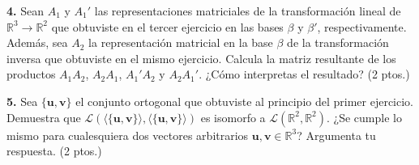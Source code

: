 \documentclass[a4paper]{article}
\begin{document}
\vspace{5mm}
\textbf{4.} Sean $A_1$ y $A_1'$ las representaciones matriciales de la transformación lineal de $\mathbb{R}^3\to\mathbb{R}^2$ que obtuviste en el tercer ejercicio en las bases $\beta$ y $\beta'$, respectivamente. Además, sea $A_2$ la representación matricial en la base $\beta$ de la transformación inversa que obtuviste en el mismo ejercicio. Calcula la matriz resultante de los productos $A_1A_2$, $A_2A_1$, $A_1'A_2$ y $A_2A_1'$. ¿Cómo interpretas el resultado? (2 ptos.)

\vspace{5mm}
\textbf{5.} Sea $\{\mathbf{u},\mathbf{v}\}$ el conjunto ortogonal que obtuviste al principio del primer ejercicio. Demuestra que $\mathcal{L}(\langle \{\mathbf{u},\mathbf{v}\} \rangle, \langle \{\mathbf{u},\mathbf{v}\} \rangle )$ es isomorfo a $\mathcal{L}(\mathbb{R}^2,\mathbb{R}^2)$. ¿Se cumple lo mismo para cualesquiera dos vectores arbitrarios $\mathbf{u}, \mathbf{v}\in\mathbb{R}^3$? Argumenta tu respuesta. (2 ptos.)
\end{document}
